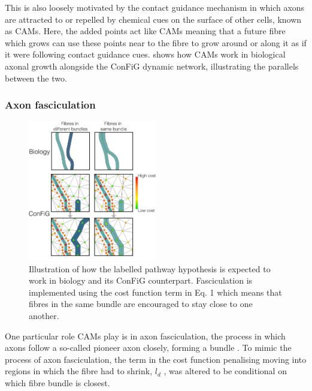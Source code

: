 This is also loosely motivated by the contact guidance mechanism in which axons are attracted to or repelled by chemical cues on the surface of other cells, known as \acp{CAM}. Here, the added points act like \acp{CAM} meaning that a future fibre which grows can use these points near to the fibre to grow around or along it as if it were following contact guidance cues.  shows how \acp{CAM} work in biological axonal growth alongside the \ac{ConFiG} dynamic network, illustrating the parallels between the two.

\subsubsection{Axon fasciculation}
\label{sec:config_fasciculation}

\begin{figure}
  \centering
  \includegraphics[width=0.5\textwidth]{figures/config/biological_fasciculate.png}
  \caption[Illustraction of the fasciculation process]{Illustration of how the labelled pathway hypothesis is expected to work in biology and its \ac{ConFiG} counterpart. Fasciculation is implemented using the cost function term in Eq. 1 which means that fibres in the same bundle are encouraged to stay close to one another.}
  \label{fig:config_fasciculation}
\end{figure}

One particular role \acp{CAM} play is in axon fasciculation, the process in which axons follow a so-called pioneer axon closely, forming a bundle \cite{Price2017,Sakisaka2005}. To mimic the process of axon fasciculation, the term in the cost function penalising moving into regions in which the fibre had to shrink, $l_d$ , was altered to be conditional on which fibre bundle is closest.

